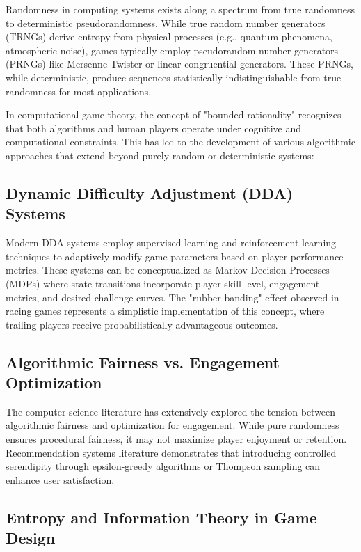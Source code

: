 \documentclass{article}
\begin{document}
Randomness in computing systems exists along a spectrum from true randomness to deterministic pseudorandomness. While true random number generators (TRNGs) derive entropy from physical processes (e.g., quantum phenomena, atmospheric noise), games typically employ pseudorandom number generators (PRNGs) like Mersenne Twister or linear congruential generators. These PRNGs, while deterministic, produce sequences statistically indistinguishable from true randomness for most applications.

In computational game theory, the concept of "bounded rationality" recognizes that both algorithms and human players operate under cognitive and computational constraints. This has led to the development of various algorithmic approaches that extend beyond purely random or deterministic systems:

\subsection{Dynamic Difficulty Adjustment (DDA) Systems}

Modern DDA systems employ supervised learning and reinforcement learning techniques to adaptively modify game parameters based on player performance metrics. These systems can be conceptualized as Markov Decision Processes (MDPs) where state transitions incorporate player skill level, engagement metrics, and desired challenge curves. The "rubber-banding" effect observed in racing games represents a simplistic implementation of this concept, where trailing players receive probabilistically advantageous outcomes.

\subsection{Algorithmic Fairness vs. Engagement Optimization}

The computer science literature has extensively explored the tension between algorithmic fairness and optimization for engagement. While pure randomness ensures procedural fairness, it may not maximize player enjoyment or retention. Recommendation systems literature demonstrates that introducing controlled serendipity through epsilon-greedy algorithms or Thompson sampling can enhance user satisfaction.

\subsection{Entropy and Information Theory in Game Design}
\end{document}

